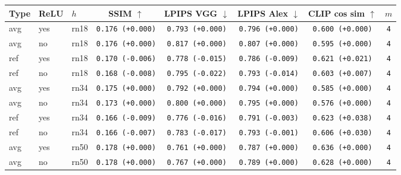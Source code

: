 \begin{tabular}{|l|l|l|c|c|c|c|c|}
\hline
Type & ReLU & $h$ & SSIM $\uparrow$ & LPIPS VGG $\downarrow$ & LPIPS Alex $\downarrow$ & CLIP cos sim $\uparrow$ & $m$ \\
\hline
\rowcolor{verylightgray}avg & yes & rn18 & \texttt{0.176 {\color{black}(+0.000)}} & \texttt{0.793 {\color{black}(+0.000)}} & \texttt{0.796 {\color{black}(+0.000)}} & \texttt{0.600 {\color{black}(+0.000)}} & \texttt{4} \\
\rowcolor{verylightgray}avg & no & rn18 & \texttt{0.176 {\color{black}(+0.000)}} & \texttt{0.817 {\color{black}(+0.000)}} & \texttt{0.807 {\color{black}(+0.000)}} & \texttt{0.595 {\color{black}(+0.000)}} & \texttt{4} \\
\hline
ref & yes & rn18 & \texttt{0.170 {\color{red}(-0.006)}} & \texttt{0.778 {\color{green}(-0.015)}} & \texttt{0.786 {\color{green}(-0.009)}} & \texttt{0.621 {\color{green}(+0.021)}} & \texttt{4} \\
ref & no & rn18 & \texttt{0.168 {\color{red}(-0.008)}} & \texttt{0.795 {\color{green}(-0.022)}} & \texttt{0.793 {\color{green}(-0.014)}} & \texttt{0.603 {\color{green}(+0.007)}} & \texttt{4} \\
\hline
\rowcolor{verylightgray}avg & yes & rn34 & \texttt{0.175 {\color{black}(+0.000)}} & \texttt{0.792 {\color{black}(+0.000)}} & \texttt{0.794 {\color{black}(+0.000)}} & \texttt{0.585 {\color{black}(+0.000)}} & \texttt{4} \\
\rowcolor{verylightgray}avg & no & rn34 & \texttt{0.173 {\color{black}(+0.000)}} & \texttt{0.800 {\color{black}(+0.000)}} & \texttt{0.795 {\color{black}(+0.000)}} & \texttt{0.576 {\color{black}(+0.000)}} & \texttt{4} \\
\hline
ref & yes & rn34 & \texttt{0.166 {\color{red}(-0.009)}} & \texttt{0.776 {\color{green}(-0.016)}} & \texttt{0.791 {\color{green}(-0.003)}} & \texttt{0.623 {\color{green}(+0.038)}} & \texttt{4} \\
ref & no & rn34 & \texttt{0.166 {\color{red}(-0.007)}} & \texttt{0.783 {\color{green}(-0.017)}} & \texttt{0.793 {\color{green}(-0.001)}} & \texttt{0.606 {\color{green}(+0.030)}} & \texttt{4} \\
\hline
\rowcolor{verylightgray}avg & yes & rn50 & \texttt{0.178 {\color{black}(+0.000)}} & \texttt{0.761 {\color{black}(+0.000)}} & \texttt{0.787 {\color{black}(+0.000)}} & \texttt{0.636 {\color{black}(+0.000)}} & \texttt{4} \\
\rowcolor{verylightgray}avg & no & rn50 & \texttt{0.178 {\color{black}(+0.000)}} & \texttt{0.767 {\color{black}(+0.000)}} & \texttt{0.789 {\color{black}(+0.000)}} & \texttt{0.628 {\color{black}(+0.000)}} & \texttt{4} \\

\end{tabular}
